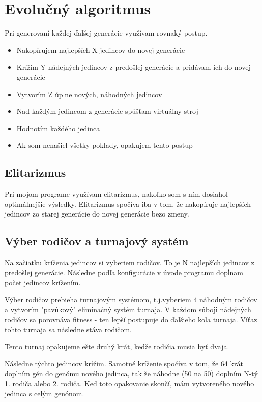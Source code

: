 \documentclass[10pt,oneside,slovak,a4paper]{article}
\begin{document}
\section{Evolučný algoritmus}

Pri generovaní každej ďalšej generácie využívam rovnaký postup.

\begin{itemize}
\item{Nakopírujem najlepších X jedincov do novej generácie}
\item{Krížim Y nádejných jedincov z predošlej generácie a pridávam ich do novej generácie}
\item{Vytvorím Z úplne nových, náhodných jedincov}
\item{Nad každým jedincom z generácie spúšťam virtuálny stroj}
\item{Hodnotím každého jedinca}
\item{Ak som nenašiel všetky poklady, opakujem tento postup}
\end{itemize}

\subsection{Elitarizmus}

Pri mojom programe využívam elitarizmus, nakoľko som s ním dosiahol optimálnejšie výsledky.
Elitarizmus spočíva iba v tom, že nakopíruje najlepších jedincov zo starej generácie do novej generácie bezo zmeny.

\subsection{Výber rodičov a turnajový systém}
Na začiatku kríženia jedincov si vyberiem rodičov. To je N najlepších jedincov z predošlej generácie.
Následne podľa konfigurácie v úvode programu dopĺnam počet jedincov krížením.

Výber rodičov prebieha turnajovým systémom, t.j.vyberiem 4 náhodným rodičov a vytvorím "pavúkový" eliminačný systém turnaja.
V každom súboji nádejných rodičov sa porovnáva fitness - ten lepší postupuje do ďalšieho kola turnaja.
Víťaz tohto turnaja sa následne stáva rodičom.

Tento turnaj opakujeme ešte druhý krát, kedže rodičia musia byť dvaja.

Následne týchto jedincov krížim.
Samotné kríženie spočíva v tom, že 64 krát doplním gén do genómu nového jedinca, tak že náhodne (50 na 50) doplním N-tý 1. rodiča alebo 2. rodiča.
Keď toto opakovanie skončí, mám vytvoreného nového jedinca s celým genónom. 
\end{document}
